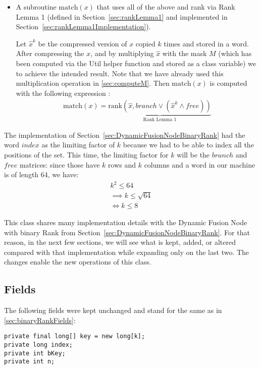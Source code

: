 \begin{itemize}
    \item
    A subroutine $\text{match}(x)$ that uses all of the above and rank via Rank Lemma 1 (defined in Section~\ref{sec:rankLemma1} and implemented in Section~\ref{sec:rankLemma1Implementation}).
    
    Let $\hat x^k$ be the compressed version of $x$ copied $k$ times and stored in a word. After compressing the $x$, and by multiplying $\hat x$ with the mask $M$ (which has been computed via the {\ttfamily Util} helper function and stored as a class variable) we to achieve the intended result. Note that we have already used this multiplication operation in \ref{sec:computeM}.
    Then $\text{match}(x)$ is computed with the following expression \cite{patrascu2014dynamic}:
    \begin{align*}
        \text{match}(x) = \underbrace{\text{rank}(\hat x, branch \vee (\hat x^k \wedge free))}_{\text{Rank Lemma 1}}
    \end{align*}
\end{itemize}

The implementation of Section~\ref{sec:DynamicFusionNodeBinaryRank} had the word $index$ as the limiting factor of $k$ because we had to be able to index all the positions of the set. This time, the limiting factor for $k$ will be the $branch$ and $free$ matrices: since those have $k$ rows and $k$ columns and a word in our machine is of length 64, we have:
\begin{align*}
    k^2 \leq 64\\
    \implies k \leq \sqrt{64}\\
    \iff k \leq 8
\end{align*}

This class shares many implementation details with the Dynamic Fusion Node with binary Rank from Section~\ref{sec:DynamicFusionNodeBinaryRank}. For that reason, in the next few sections, we will see what is kept, added, or altered compared with that implementation while expanding only on the last two. The changes enable the new operations of this class.

\subsection{Fields} \label{sec:dontCaresRankFields}
The following fields were kept unchanged and stand for the same as in \ref{sec:binaryRankFields}:
\begin{lstlisting}
private final long[] key = new long[k];
private long index;
private int bKey;
private int n;
\end{lstlisting}

